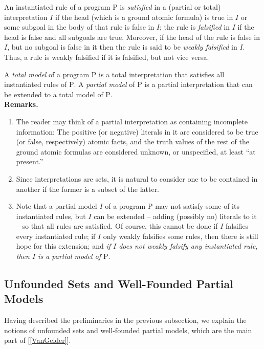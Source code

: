 An instantiated rule of a program $\mathrm{P}$ is \emph{satisfied} in a (partial or total) interpretation $I$ if the head (which is a ground atomic formula) is true in $I$ or some subgoal in the body of that rule is false in $I$; the rule is \emph{falsified} in $I$ if the head is false and all subgoals are true. Moreover, if the head of the rule is false in $I$, but no subgoal is false in it then the rule is said to be \emph{weakly falsified} in $I$. Thus, a rule is weakly falsified if it is falsified, but not vice versa.

A \emph{total model} of a program $\mathrm{P}$ is a total interpretation that satisfies all instantiated rules of $\mathrm{P}$. A \emph{partial model} of $\mathrm{P}$ is a partial interpretation that can be extended to a total model of $\mathrm{P}$.
\ \medskip\\
\noindent\textbf{Remarks.}
\begin{enumerate}[label=(\alph*)]
%
\item The reader may think of a partial interpretation as containing incomplete information: The positive (or negative) literals in it are considered to be true (or false, respectively) atomic facts, and the truth values of the rest of the ground atomic formulas are considered unknown, or unspecified, at least ``at present.''
%
\item Since interpretations are sets, it is natural to consider one to be contained in another if the former is a subset of the latter.
%
\item Note that a partial model $I$ of a program $\mathrm{P}$ may not satisfy some of its instantiated rules, but $I$ can be extended -- adding (possibly no) literals to it -- so that all rules are satisfied. Of course, this cannot be done if $I$ falsifies every instantiated rule; if $I$ only weakly falsifies some rules, then there is still hope for this extension; and \emph{if $I$ does not weakly falsify any instantiated rule, then $I$ is a partial model of $\mathrm{P}$}.
%
\end{enumerate}

\subsection{Unfounded Sets and Well-Founded Partial Models}
Having described the preliminaries in the previous subsection, we explain the notions of unfounded sets and well-founded partial models, which are the main part of [\ref{VanGelder}].

